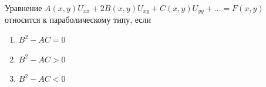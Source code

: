 Уравнение \(A\left(x,y\right)U_{xx}+2B\left(x,y\right)U_{xy}+C\left(x,y\right)U_{yy}+\dots =F\left(x,y\right)\) относится к параболическому типу, если

\begin{enumerate}[label=\arabic*)]
    \item \(B^2-AC=0\)
    \item \(B^2-AC>0\)
    \item \(B^2-AC<0\)
\end{enumerate}

